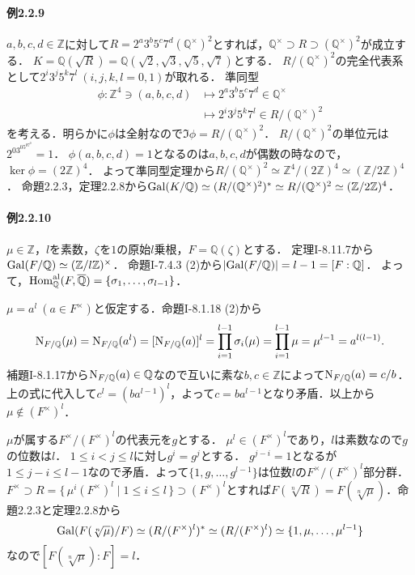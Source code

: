 \paragraph{例2.2.9}
$a, b, c, d\in\mathbb{Z}$に対して$R=2^a3^b5^c7^d(\mathbb{Q}^\times)^2$とすれば，$\mathbb{Q}^\times\supset R\supset(\mathbb{Q}^\times)^2$が成立する．
$K=\mathbb{Q}(\sqrt{R})=\mathbb{Q}(\sqrt{2}, \sqrt{3}, \sqrt{5}, \sqrt{7})$とする．
$R/(\mathbb{Q}^\times)^2$の完全代表系として$2^i3^j5^k7^l\ (i, j, k, l=0, 1)$が取れる．
準同型
\begin{align*}
  \phi\colon\mathbb{Z}^4\ni(a, b, c, d) &\mapsto 2^a3^b5^c7^d\in\mathbb{Q}^\times\\
  &\mapsto 2^i3^j5^k7^l\in R/(\mathbb{Q}^\times)^2
\end{align*}
を考える．明らかに$\phi$は全射なので$\Im\phi=R/(\mathbb{Q}^\times)^2$．
$R/(\mathbb{Q}^\times)^2$の単位元は$2^03^05^07^0=1$．
$\phi(a, b, c, d)=1$となるのは$a, b, c, d$が偶数の時なので，$\ker\phi=(2\mathbb{Z})^4$．
よって準同型定理から$R/(\mathbb{Q}^\times)^2\simeq\mathbb{Z}^4/(2\mathbb{Z})^4\simeq(\mathbb{Z}/2\mathbb{Z})^4$．
命題2.2.3，定理2.2.8から$\operatorname{Gal}(K/\mathbb{Q})\simeq(R/(\mathbb{Q}^\times)^2)^\ast\simeq R/(\mathbb{Q}^\times)^2\simeq(\mathbb{Z}/2\mathbb{Z})^4$．

\paragraph{例2.2.10}
$\mu\in\mathbb{Z}$，$l$を素数，$\zeta$を$1$の原始$l$乗根，$F=\mathbb{Q}(\zeta)$とする．
定理I-8.11.7から$\operatorname{Gal}(F/\mathbb{Q})\simeq(\mathbb{Z}/l\mathbb{Z})^\times$．
命題I-7.4.3 (2)から$\lvert\operatorname{Gal}(F/\mathbb{Q})\rvert=l-1=[F:\mathbb{Q}]$．
よって，$\operatorname{Hom}_\mathbb{Q}^\text{al}(F, \overline{\mathbb{Q}})=\{\sigma_1, \ldots, \sigma_{l-1}\}$．

$\mu=a^l\ (a\in F^\times)$と仮定する．命題I-8.1.18 (2)から
\[\operatorname{N}_{F/\mathbb{Q}}(\mu)=\operatorname{N}_{F/\mathbb{Q}}(a^l)=[\operatorname{N}_{F/\mathbb{Q}}(a)]^l=\prod_{i=1}^{l-1}\sigma_i(\mu)=\prod_{i=1}^{l-1}\mu=\mu^{l-1}=a^{l(l-1)}.\]
補題I-8.1.17から$\operatorname{N}_{F/\mathbb{Q}}(a)\in\mathbb{Q}$なので互いに素な$b, c\in\mathbb{Z}$によって$\operatorname{N}_{F/\mathbb{Q}}(a)=c/b$．
上の式に代入して$c^l=(ba^{l-1})^l$，よって$c=ba^{l-1}$となり矛盾．以上から$\mu\not\in(F^\times)^l$．

$\mu$が属する$F^\times/(F^\times)^l$の代表元を$g$とする．
$\mu^l\in(F^\times)^l$であり，$l$は素数なので$g$の位数は$l$．
$1\leq i< j\leq l$に対し$g^i=g^j$とする．
$g^{j-i}=1$となるが$1\leq j-i\leq l-1$なので矛盾．よって$\{1, g, \ldots, g^{l-1}\}$は位数$l$の$F^\times/(F^\times)^l$部分群．
$F^\times\supset R=\{\, \mu^i(F^\times)^l\mid1\leq i\leq l\, \}\supset(F^\times)^l$とすれば$F(\sqrt[n]{R})=F(\sqrt[n]{\mu})$．命題2.2.3と定理2.2.8から
\[\operatorname{Gal}(F(\sqrt[n]{\mu})/F)\simeq(R/(F^\times)^l)^\ast\simeq(R/(F^\times)^l)\simeq\{1, \mu, \ldots, \mu^{l-1}\}\]
なので$[F(\sqrt[n]{\mu}):F]=l$．


